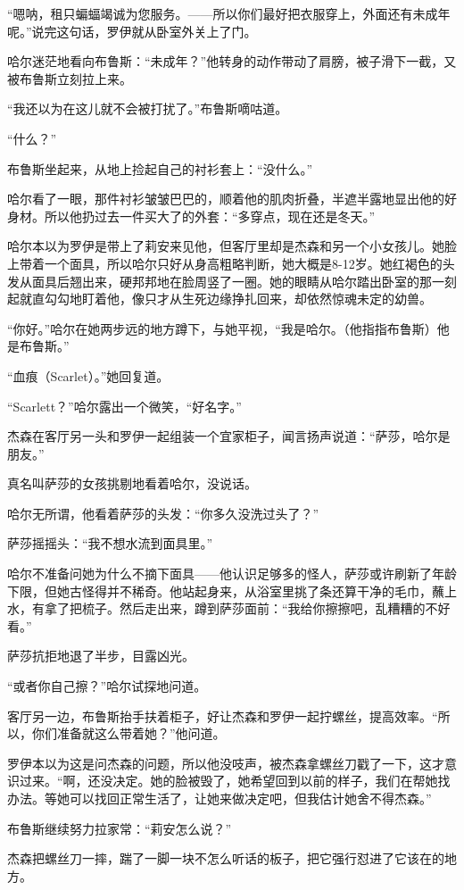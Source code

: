 \documentclass[../main]{subfiles}
\begin{document}
“嗯呐，租只蝙蝠竭诚为您服务。——所以你们最好把衣服穿上，外面还有未成年呢。”说完这句话，罗伊就从卧室外关上了门。

哈尔迷茫地看向布鲁斯：“未成年？”他转身的动作带动了肩膀，被子滑下一截，又被布鲁斯立刻拉上来。

“我还以为在这儿就不会被打扰了。”布鲁斯嘀咕道。

“什么？”

布鲁斯坐起来，从地上捡起自己的衬衫套上：“没什么。”

哈尔看了一眼，那件衬衫皱皱巴巴的，顺着他的肌肉折叠，半遮半露地显出他的好身材。所以他扔过去一件买大了的外套：“多穿点，现在还是冬天。”

哈尔本以为罗伊是带上了莉安来见他，但客厅里却是杰森和另一个小女孩儿。她脸上带着一个面具，所以哈尔只好从身高粗略判断，她大概是8-12岁。她红褐色的头发从面具后翘出来，硬邦邦地在脸周竖了一圈。她的眼睛从哈尔踏出卧室的那一刻起就直勾勾地盯着他，像只才从生死边缘挣扎回来，却依然惊魂未定的幼兽。

“你好。”哈尔在她两步远的地方蹲下，与她平视，“我是哈尔。（他指指布鲁斯）他是布鲁斯。”

“血痕（Scarlet）。”她回复道。

“Scarlett？”哈尔露出一个微笑，“好名字。”

杰森在客厅另一头和罗伊一起组装一个宜家柜子，闻言扬声说道：“萨莎，哈尔是朋友。”

真名叫萨莎的女孩挑剔地看着哈尔，没说话。

哈尔无所谓，他看着萨莎的头发：“你多久没洗过头了？”

萨莎摇摇头：“我不想水流到面具里。”

哈尔不准备问她为什么不摘下面具——他认识足够多的怪人，萨莎或许刷新了年龄下限，但她古怪得并不稀奇。他站起身来，从浴室里挑了条还算干净的毛巾，蘸上水，有拿了把梳子。然后走出来，蹲到萨莎面前：“我给你擦擦吧，乱糟糟的不好看。”

萨莎抗拒地退了半步，目露凶光。

“或者你自己擦？”哈尔试探地问道。

客厅另一边，布鲁斯抬手扶着柜子，好让杰森和罗伊一起拧螺丝，提高效率。“所以，你们准备就这么带着她？”他问道。

罗伊本以为这是问杰森的问题，所以他没吱声，被杰森拿螺丝刀戳了一下，这才意识过来。“啊，还没决定。她的脸被毁了，她希望回到以前的样子，我们在帮她找办法。等她可以找回正常生活了，让她来做决定吧，但我估计她舍不得杰森。”

布鲁斯继续努力拉家常：“莉安怎么说？”

杰森把螺丝刀一摔，踹了一脚一块不怎么听话的板子，把它强行怼进了它该在的地方。
\end{document}

